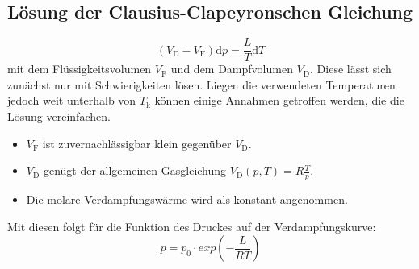          \subsection{Lösung der Clausius-Clapeyronschen Gleichung}
         \begin{equation}
           (V_\text{D}-V_\text{F})\text{d}p = \frac{L}{T}\text{d}T \label{eq:DGL}
           \end{equation}
           mit dem Flüssigkeitsvolumen $V_\text{F}$ und dem Dampfvolumen $V_\text{D}$.
Diese lässt sich zunächst nur mit Schwierigkeiten lösen.
Liegen die verwendeten Temperaturen jedoch weit unterhalb von $T_\text{k}$ können
 einige Annahmen getroffen werden, die die Lösung vereinfachen.
\begin{itemize}
  \item $V_\text{F}$ ist zuvernachlässigbar klein gegenüber $V_\text{D}$.
  \item $V_\text{D}$ genügt der allgemeinen Gasgleichung $V_\text{D}(p,T) = R\frac{T}{p}$.
  \item Die molare Verdampfungswärme wird als konstant angenommen.
\end{itemize}
Mit diesen folgt für die Funktion des Druckes auf der Verdampfungskurve:
\begin{equation}
  p = p_0 \cdot exp \left(-\frac{L}{RT}\right) \label{eq:DGLLs}
\end{equation}
